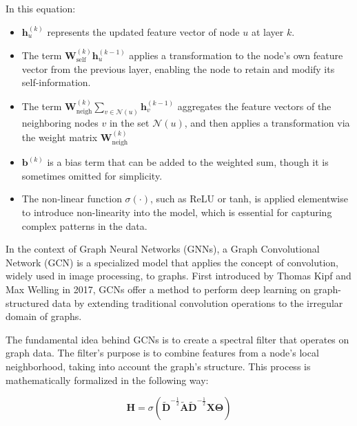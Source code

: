 In this equation:
\begin{itemize}
    \item \( \mathbf{h}_u^{(k)} \) represents the updated feature vector of node \( u \) at layer \( k \).
    \item The term \( \mathbf{W}_{\text{self}}^{(k)} \mathbf{h}_u^{(k-1)} \) applies a transformation to the node's own feature vector from the previous layer, enabling the node to retain and modify its self-information. 
    \item The term \( \mathbf{W}_{\text{neigh}}^{(k)} \sum_{v \in \mathcal{N}(u)} \mathbf{h}_v^{(k-1)} \) aggregates the feature vectors of the neighboring nodes \( v \) in the set \( \mathcal{N}(u) \), and then applies a transformation via the weight matrix \( \mathbf{W}_{\text{neigh}}^{(k)} \) 
    \item \( \mathbf{b}^{(k)} \) is a bias term that can be added to the weighted sum, though it is sometimes omitted for simplicity. 
    \item  The non-linear function \( \sigma(\cdot) \), such as ReLU or tanh, is applied elementwise to introduce non-linearity into the model, which is essential for capturing complex patterns in the data.

\end{itemize}



In the context of Graph Neural Networks (GNNs), a Graph Convolutional Network (GCN) is a specialized model that applies the concept of convolution, widely used in image processing, to graphs. First introduced by Thomas Kipf and Max Welling in 2017, GCNs offer a method to perform deep learning on graph-structured data by extending traditional convolution operations to the irregular domain of graphs.

The fundamental idea behind GCNs is to create a spectral filter that operates on graph data. The filter's purpose is to combine features from a node's local neighborhood, taking into account the graph's structure. This process is mathematically formalized in the following way:

\[
\mathbf{H} = \sigma\left( \tilde{\mathbf{D}}^{-\frac{1}{2}} \tilde{\mathbf{A}} \tilde{\mathbf{D}}^{-\frac{1}{2}} \mathbf{X} \mathbf{\Theta} \right)
\]

